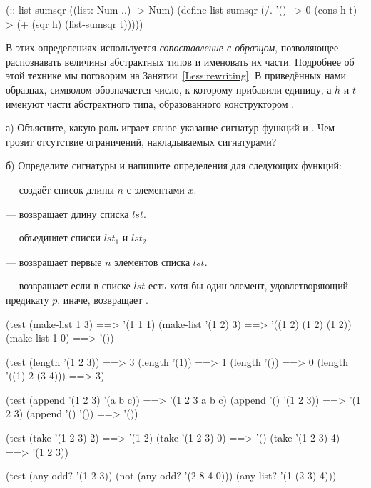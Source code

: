 \begin{SchemeCode}[emph={h,t}]
(:: list-sumsqr ((list: Num ..) -> Num)
 (define list-sumsqr
   (/. '() --> 0
       (cons h t) --> (+ (sqr h) (list-sumsqr t)))))
\end{SchemeCode}

В этих определениях используется \emph{сопоставление с образцом}, позволяющее распознавать величины абстрактных типов и именовать их части. Подробнее об этой технике мы поговорим на Занятии~\ref{Less:rewriting}. В приведённых нами образцах, символом  обозначается число, к которому прибавили единицу, а $h$ и $t$ именуют части абстрактного типа, образованного конструктором .

\newpage
\begin{Assignment}
а) Объясните, какую роль играет явное указание сигнатур функций  и . Чем грозит отсутствие ограничений, накладываемых сигнатурами?

\medskip
б) Определите сигнатуры и напишите определения для следующих функций:

 --- создаёт список длины $n$ с элементами $x$.

 --- возвращает длину списка $lst$.

 --- объединяет списки $lst_1$ и $lst_2$.

 --- возвращает первые $n$ элементов списка $lst$.

 --- возвращает  если в списке $lst$ есть хотя бы один элемент, удовлетворяющий предикату $p$, иначе, возвращает .

\begin{Specification}
(test 
  (make-list 1 3)      ==> '(1 1 1)
  (make-list '(1 2) 3) ==> '((1 2) (1 2) (1 2))
  (make-list 1 0)      ==> '())
\end{Specification}

\begin{Specification}
(test 
  (length '(1 2 3))       ==> 3
  (length '(1))           ==> 1
  (length '())            ==> 0
  (length '((1) 2 (3 4))) ==> 3)
\end{Specification}

\begin{Specification}
(test 
  (append '(1 2 3) '(a b c)) ==>  '(1 2 3 a b c)
  (append '() '(1 2 3))      ==>  '(1 2 3)
  (append '() '())           ==>  '())
\end{Specification}

\begin{Specification}
(test 
  (take '(1 2 3) 2)    ==>  '(1 2)
  (take '(1 2 3) 0)    ==>  '()
  (take '(1 2 3) 4)    ==>  '(1 2 3))
\end{Specification}

\begin{Specification}
(test 
  (any odd? '(1 2 3))
  (not (any odd? '(2 8 4 0)))
  (any list? '(1 (2 3) 4)))
\end{Specification}
\end{Assignment}

